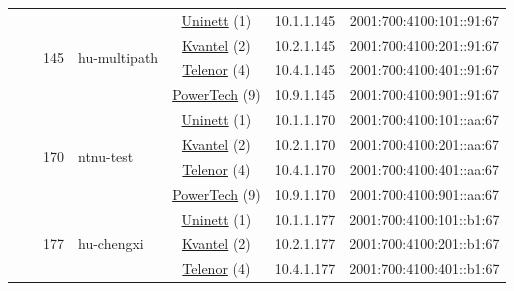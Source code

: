 \begin{small}
\begin{center}
\begin{longtable}{|c|c|c|c|c|c|c|c|}
  &  & \multirow{4}{*}{\tiny{145}} & \multicolumn{1}{|l|}{\multirow{4}{*}{\tiny{hu-multipath}}} & \multicolumn{2}{|c|}{\tiny{\href{https://www.uninett.no}{Uninett} (1)}} & \tiny{10.1.1.145} & \tiny{2001:700:4100:101::91:67} \\* \cline{5-5}\cline{6-6}\cline{7-7}\cline{8-8}
  &  &  &  & \multicolumn{2}{|c|}{\tiny{\href{http://kvantel.no}{Kvantel} (2)}} & \tiny{10.2.1.145} & \tiny{2001:700:4100:201::91:67} \\* \cline{5-5}\cline{6-6}\cline{7-7}\cline{8-8}
  &  &  &  & \multicolumn{2}{|c|}{\tiny{\href{https://www.telenor.no}{Telenor} (4)}} & \tiny{10.4.1.145} & \tiny{2001:700:4100:401::91:67} \\* \cline{5-5}\cline{6-6}\cline{7-7}\cline{8-8}
  &  &  &  & \multicolumn{2}{|c|}{\tiny{\href{http://www.powertech.no}{PowerTech} (9)}} & \tiny{10.9.1.145} & \tiny{2001:700:4100:901::91:67} \\* \cline{3-3}\cline{4-4}\cline{5-5}\cline{6-6}\cline{7-7}\cline{8-8}
  &  & \multirow{4}{*}{\tiny{170}} & \multicolumn{1}{|l|}{\multirow{4}{*}{\tiny{ntnu-test}}} & \multicolumn{2}{|c|}{\tiny{\href{https://www.uninett.no}{Uninett} (1)}} & \tiny{10.1.1.170} & \tiny{2001:700:4100:101::aa:67} \\* \cline{5-5}\cline{6-6}\cline{7-7}\cline{8-8}
  &  &  &  & \multicolumn{2}{|c|}{\tiny{\href{http://kvantel.no}{Kvantel} (2)}} & \tiny{10.2.1.170} & \tiny{2001:700:4100:201::aa:67} \\* \cline{5-5}\cline{6-6}\cline{7-7}\cline{8-8}
  &  &  &  & \multicolumn{2}{|c|}{\tiny{\href{https://www.telenor.no}{Telenor} (4)}} & \tiny{10.4.1.170} & \tiny{2001:700:4100:401::aa:67} \\* \cline{5-5}\cline{6-6}\cline{7-7}\cline{8-8}
  &  &  &  & \multicolumn{2}{|c|}{\tiny{\href{http://www.powertech.no}{PowerTech} (9)}} & \tiny{10.9.1.170} & \tiny{2001:700:4100:901::aa:67} \\* \cline{3-3}\cline{4-4}\cline{5-5}\cline{6-6}\cline{7-7}\cline{8-8}
  &  & \multirow{4}{*}{\tiny{177}} & \multicolumn{1}{|l|}{\multirow{4}{*}{\tiny{hu-chengxi}}} & \multicolumn{2}{|c|}{\tiny{\href{https://www.uninett.no}{Uninett} (1)}} & \tiny{10.1.1.177} & \tiny{2001:700:4100:101::b1:67} \\* \cline{5-5}\cline{6-6}\cline{7-7}\cline{8-8}
  &  &  &  & \multicolumn{2}{|c|}{\tiny{\href{http://kvantel.no}{Kvantel} (2)}} & \tiny{10.2.1.177} & \tiny{2001:700:4100:201::b1:67} \\* \cline{5-5}\cline{6-6}\cline{7-7}\cline{8-8}
  &  &  &  & \multicolumn{2}{|c|}{\tiny{\href{https://www.telenor.no}{Telenor} (4)}} & \tiny{10.4.1.177} & \tiny{2001:700:4100:401::b1:67} \\* \cline{5-5}\cline{6-6}\cline{7-7}\cline{8-8}

\end{longtable}
\end{center}
\end{small}
